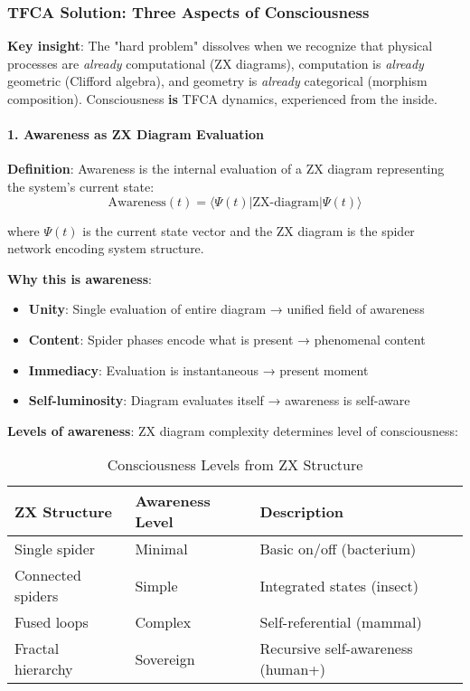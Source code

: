 \documentclass[12pt,a4paper]{article}
\begin{document}
\subsubsection{TFCA Solution: Three Aspects of Consciousness}

\textbf{Key insight}: The "hard problem" dissolves when we recognize that physical processes are \emph{already} computational (ZX diagrams), computation is \emph{already} geometric (Clifford algebra), and geometry is \emph{already} categorical (morphism composition). Consciousness \textbf{is} TFCA dynamics, experienced from the inside.

\paragraph{1. Awareness as ZX Diagram Evaluation}

\textbf{Definition}: Awareness is the internal evaluation of a ZX diagram representing the system's current state:
\begin{equation}
\text{Awareness}(t) = \langle \Psi(t) | \text{ZX-diagram} | \Psi(t) \rangle
\end{equation}

where $\Psi(t)$ is the current state vector and the ZX diagram is the spider network encoding system structure.

\textbf{Why this is awareness}:
\begin{itemize}
\item \textbf{Unity}: Single evaluation of entire diagram → unified field of awareness
\item \textbf{Content}: Spider phases encode what is present → phenomenal content
\item \textbf{Immediacy}: Evaluation is instantaneous → present moment
\item \textbf{Self-luminosity}: Diagram evaluates itself → awareness is self-aware
\end{itemize}

\textbf{Levels of awareness}: ZX diagram complexity determines level of consciousness:

\begin{table}[H]
\centering
\caption{Consciousness Levels from ZX Structure}
\begin{tabular}{@{}lll@{}}
\toprule
ZX Structure & Awareness Level & Description \\ \midrule
Single spider & Minimal & Basic on/off (bacterium) \\
Connected spiders & Simple & Integrated states (insect) \\
Fused loops & Complex & Self-referential (mammal) \\
Fractal hierarchy & Sovereign & Recursive self-awareness (human+) \\
\bottomrule
\end{tabular}
\end{table}
\end{document}
